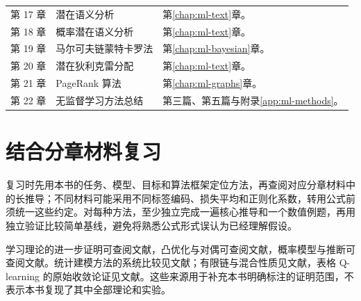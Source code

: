 \begin{longtable}{@{}L{2.7cm}L{5.3cm}L{5.7cm}@{}}
  第 17 章 & 潜在语义分析 & 第\ref{chap:ml-text}章。\\
  第 18 章 & 概率潜在语义分析 & 第\ref{chap:ml-text}章。\\
  第 19 章 & 马尔可夫链蒙特卡罗法 & 第\ref{chap:ml-bayesian}章。\\
  第 20 章 & 潜在狄利克雷分配 & 第\ref{chap:ml-text}章。\\
  第 21 章 & PageRank 算法 & 第\ref{chap:ml-graphs}章。\\
  第 22 章 & 无监督学习方法总结 & 第三篇、第五篇与附录\ref{app:ml-methods}。\\
  \bottomrule
\end{longtable}

\section{结合分章材料复习}

复习时先用本书的任务、模型、目标和算法框架定位方法，再查阅对应分章材料中的长推导；不同材料可能采用不同标签编码、损失平均和正则化系数，转用公式前须统一这些约定。对每种方法，至少独立完成一遍核心推导和一个数值例题，再用独立验证比较简单基线，避免将熟悉公式形式误认为已经理解假设。

学习理论的进一步证明可查阅文献\cite{ml-uml}，凸优化与对偶可查阅文献\cite{ml-convex}，概率模型与推断可查阅文献\cite{ml-prml}。统计建模方法的系统比较见文献\cite{ml-esl}；有限链与混合性质见文献\cite{ml-markov}，表格 Q-learning 的原始收敛论证见文献\cite{ml-qlearning}。这些来源用于补充本书明确标注的证明范围，不表示本书复现了其中全部理论和实验。




